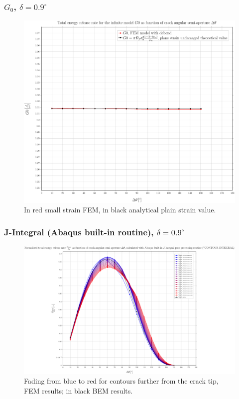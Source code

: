 \documentclass[first,firstsupp,lastsupp,handout,last,hyperref,table]{ETHclass}
\begin{document}
\begin{frame}
\frametitle{\small $G_{0}$, $\delta=0.9^{\circ}$}
\vspace{-0.5cm}
\centering
\captionsetup[figure]{font=scriptsize,labelfont=scriptsize}
\begin{figure}[!h]
\centering
\includegraphics[height=0.7\textheight]{2017-07-10_AbqRunSummary_SmallStrainD09_G0_Summary.pdf}
  \caption{\scriptsize In red small strain FEM, in black analytical plain strain value.}
  \label{fig:res1}
\end{figure}
\end{frame}

\begin{frame}
\frametitle{\small J-Integral (Abaqus built-in routine), $\delta=0.9^{\circ}$}
\vspace{-0.5cm}
\centering
\captionsetup[figure]{font=scriptsize,labelfont=scriptsize}
\begin{figure}[!h]
\centering
\includegraphics[height=0.7\textheight]{2017-07-10_AbqRunSummary_SmallStrainD09_J-INT_Summary.pdf}
  \caption{\scriptsize Fading from blue to red for contours further from the crack tip, FEM results; in black BEM results.}
  \label{fig:res1}
\end{figure}
\end{frame}
\end{document}
